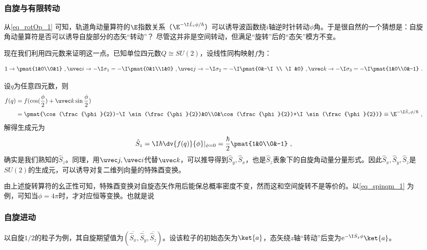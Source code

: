 \subsubsection{自旋与有限转动}

从\autoref{eq_rotOp_1} 可知，轨道角动量算符的$\E$指数关系（$\E^{-\I \hat L_i\phi/\hbar}$）可以诱导波函数绕$i$轴逆时针转动$\phi$角。于是很自然的一个猜想是：自旋角动量算符是否可以诱导自旋部分的态矢“转动”？ 尽管这并非是空间转动，但满足“旋转”后的“态矢”模方不变。

现在我们利用四元数来证明这一点。已知单位四元数$Q\cong SU(2)$，设线性同构映射$f$为：

\begin{equation}
1\rightarrow\pmat{1&0\\0&1}~,\uvec i\rightarrow-\I\sigma_1=-\I\pmat{0&1\\1&0}~,\uvec j\rightarrow -\I\sigma_2=-\I\pmat{0&-\I\\ \I&0}~,\uvec k\rightarrow -\I\sigma_3=-\I\pmat{1&0\\0&-1}~.
\end{equation}

设$q$为任意四元数，则
\begin{equation}\label{eq_spinqm_1}
\begin{aligned}
f(q)&=f(\cos(\frac{\phi}{2})+\uvec k \sin\frac{\phi}{2})\\
&=\pmat{\cos(\frac{\phi}{2})-\I \sin (\frac{\phi}{2})&0\\0&\cos(\frac{\phi}{2})+\I\sin (\frac{\phi}{2})}\equiv\E^{-\I \hat S_z \phi /\hbar}~,
\end{aligned}
\end{equation}
解得生成元为
\begin{equation}
\hat S_z=\I\hbar \dv{f(q)}{\phi}|_{\phi=0}=\frac{\hbar}{2}\pmat{1&0\\0&-1}~,
\end{equation}
确实是我们熟知的$\hat S_z$。同理，用$\uvec j,\uvec i$代替$\uvec k$，可以推导得到$\hat S_y,\hat S_x$，也是$\hat S_z$表象下的自旋角动量分量形式。因此$\hat S_x,\hat S_y,\hat S_z$是$SU(2)$的生成元，可以诱导对复二维列向量的特殊酉变换。

由上述旋转算符的幺正性可知，特殊酉变换对自旋态矢作用后能保总概率密度不变，然而这和空间旋转不是等价的。以\autoref{eq_spinqm_1} 为例，可知当$\phi=4\pi$时，才对应恒等变换。也就是说
\subsubsection{自旋进动}
以自旋$1/2$的粒子为例，其自旋期望值为$(\overline{\hat S_x},\overline{\hat S_y},\overline{\hat S_z})$。设该粒子的初始态矢为$\ket{a}$，态矢绕$z$轴“转动”后变为$\mathrm e^{- \I\hat S_z\phi}\ket{a}$。


